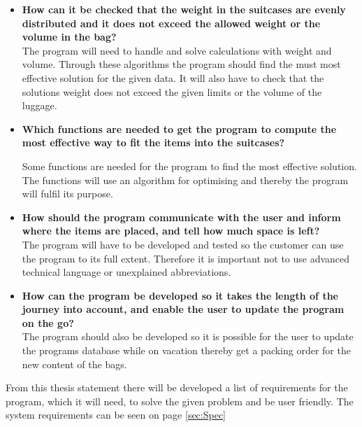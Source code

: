 \begin{itemize}
\item \textbf{How can it be checked that the weight in the suitcases are evenly distributed and it does not exceed the allowed weight or the volume in the bag?}\\

The program will need to handle and solve calculations with weight and volume. Through these algorithms the program should find the must most effective solution for the given data. It will also have to check that the solutions weight does not exceed the given limits or the volume of the luggage.

\item \textbf{Which functions are needed to get the program to compute the most effective way to fit the items into the suitcases?}\newline

Some functions are needed for the program to find the most effective solution. The functions will use an algorithm for optimising and thereby the program will fulfil its purpose.

\item \textbf{How should the program communicate with the user and inform where the items are placed, and tell how much space is left?}\\

The program will have to be developed and tested so the customer can use the program to its full extent. Therefore it is important not to use advanced technical language or unexplained abbreviations.

\item \textbf{How can the program be developed so it takes the length of the journey  into account, and enable the user to update the program on the go?}\\

The program should also be developed so it is possible for the user to update the programs database while on vacation thereby get a packing order for the new content of the bags.
\end{itemize}

From this thesis statement there will be developed a list of requirements for the program, which it will need, to solve the given problem and be user friendly. The system requirements can be seen on page \ref{sec:Spec}
